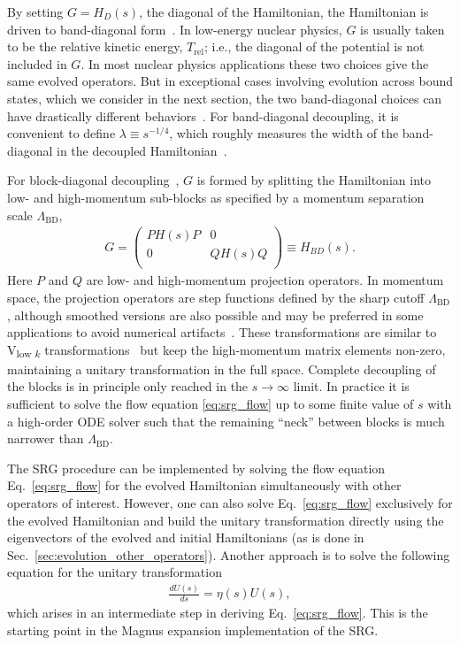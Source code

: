 \documentclass[10pt,aps,prc,floatfix,twocolumn,nofootinbib]{revtex4-1}
\newcommand{\LambdaBD}{{\Lambda_{\text{BD}}}}
\newcommand{\Trel}{\ensuremath{T_{\textrm{rel}}}}
\begin{document}
By setting $G=H_D(s)$, the diagonal of the Hamiltonian, the Hamiltonian is driven to band-diagonal form~\cite{Wegner:1994ab}.
In low-energy nuclear physics, $G$ is usually taken to be the relative kinetic energy, \Trel; i.e., the diagonal of the potential is not included in $G$. 
In most nuclear physics applications these two choices give the same evolved operators. 
But in exceptional cases involving evolution across bound states, which we consider in the next section, the two band-diagonal choices can have drastically different behaviors~\cite{Glazek:2008pg,Wendt:2011qj}. 
For band-diagonal decoupling, it is convenient to define $\lambda \equiv s^{-1/4}$, which roughly measures the width of the band-diagonal in the decoupled Hamiltonian~\cite{Anderson:2010aq}. 


For block-diagonal decoupling~\cite{Anderson:2008mu,Szpigel:2016rbt}, $G$ is formed by splitting the Hamiltonian into low- and high-momentum sub-blocks as specified by a momentum separation scale $\LambdaBD$,
%
\begin{eqnarray}
	\label{eq:block_diag_g}
	G =
	\begin{pmatrix}
		PH(s)P & 0 \\
		0 & QH(s)Q \\
	\end{pmatrix}
	\equiv H_{BD}(s).
\end{eqnarray}
%
Here $P$ and $Q$ are low- and high-momentum projection operators.
In momentum space, the projection operators are step functions defined by the sharp cutoff $\LambdaBD$, although smoothed versions are also possible and may be preferred in some applications to avoid numerical artifacts~\cite{Anderson:2008mu}. 
These transformations are similar to V\textsubscript{low $k$} transformations~\cite{Bogner:2001gq,Bogner:2001jn,Bogner:2003wn} but keep the high-momentum matrix elements non-zero, maintaining a unitary transformation in the full space.
Complete decoupling of the blocks is in principle only reached in the $s \rightarrow \infty$ limit. 
In practice it is sufficient to solve the flow equation \eqref{eq:srg_flow} up to some finite value of $s$ with a high-order ODE solver such that the remaining ``neck'' between blocks is much narrower than $\LambdaBD$.


The SRG procedure can be implemented by solving the flow equation Eq.~\eqref{eq:srg_flow} for the evolved Hamiltonian simultaneously with other operators of interest.
However, one can also solve Eq.~\eqref{eq:srg_flow} exclusively for the evolved Hamiltonian and build the unitary transformation directly using the eigenvectors of the evolved and initial Hamiltonians (as is done in Sec.~\ref{sec:evolution_other_operators}).
Another approach is to solve the following equation for the unitary transformation
%
\begin{eqnarray}
	\label{eq:unitary_trans}
	\frac{dU(s)}{ds} = \eta(s) U(s),
\end{eqnarray}
%
which arises in an intermediate step in deriving Eq.~\eqref{eq:srg_flow}.
This is the starting point in the Magnus expansion implementation of the SRG.
\end{document}
